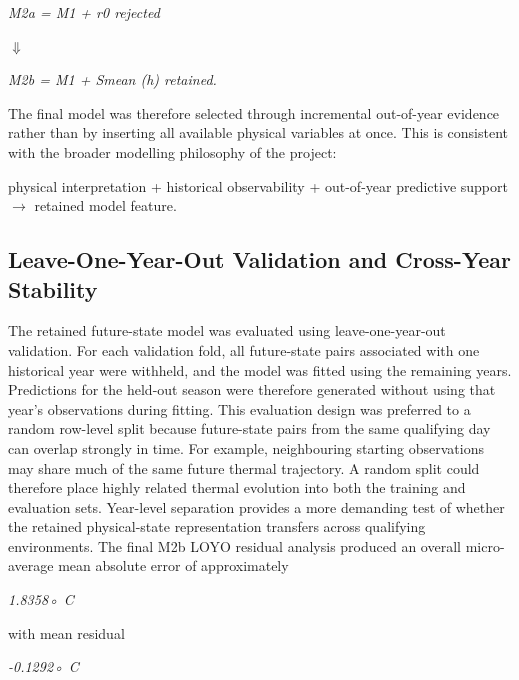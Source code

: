 \begin{center}\textit{M2a = M1 + r0       rejected}\end{center}

\begin{center}\textit{\ensuremath{\Downarrow}}\end{center}

\begin{center}\textit{M2b = M1 + Smean (h)            retained.}\end{center}

The final model was therefore selected through incremental out-of-year evidence rather than by inserting all available physical variables at once. This is consistent with the broader modelling philosophy of the project:

physical interpretation + historical observability + out-of-year predictive support \ensuremath{\rightarrow} retained model feature.

\subsection{Leave-One-Year-Out Validation and Cross-Year Stability}
The retained future-state model was evaluated using leave-one-year-out validation. For each validation fold, all future-state pairs associated with one historical year were withheld, and the model was fitted using the remaining years. Predictions for the held-out season were therefore generated without using that year's observations during fitting. This evaluation design was preferred to a random row-level split because future-state pairs from the same qualifying day can overlap strongly in time. For example, neighbouring starting observations may share much of the same future thermal trajectory. A random split could therefore place highly related thermal evolution into both the training and evaluation sets. Year-level separation provides a more demanding test of whether the retained physical-state representation transfers across qualifying environments. The final M2b LOYO residual analysis produced an overall micro-average mean absolute error of approximately

\begin{center}\textit{1.8358◦ C}\end{center}

with mean residual

\begin{center}\textit{-0.1292◦ C}\end{center}

